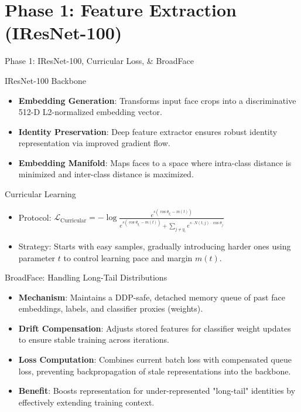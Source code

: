 \documentclass[t]{beamer}
\begin{document}
\section{Phase 1: Feature Extraction (IResNet-100)}

\begin{frame}[allowframebreaks]{Phase 1: IResNet-100, Curricular Loss, & BroadFace}
    \begin{block}{IResNet-100 Backbone}
        \begin{itemize}
            \item \textbf{Embedding Generation}: Transforms input face crops into a discriminative 512-D L2-normalized embedding vector.
            \item \textbf{Identity Preservation}: Deep feature extractor ensures robust identity representation via improved gradient flow.
            \item \textbf{Embedding Manifold}: Maps faces to a space where intra-class distance is minimized and inter-class distance is maximized.
        \end{itemize}
    \end{block}

    \begin{block}{Curricular Learning}
        \begin{itemize}
            \item Protocol: $\mathcal{L}_{\text{Curricular}} = -\log \frac{e^{s(\cos\theta_{y_i} - m(t))}}{e^{s(\cos\theta_{y_i} - m(t))} + \sum_{j \neq y_i} e^{s \cdot N(t, j) \cdot \cos\theta_j}}$
            \item Strategy: Starts with easy samples, gradually introducing harder ones using parameter $t$ to control learning pace and margin $m(t)$.
        \end{itemize}
    \end{block}
    \framebreak
    \begin{block}{BroadFace: Handling Long-Tail Distributions}
        \begin{itemize}
            \item \textbf{Mechanism}: Maintains a DDP-safe, detached memory queue of past face embeddings, labels, and classifier proxies (weights).
            \item \textbf{Drift Compensation}: Adjusts stored features for classifier weight updates to ensure stable training across iterations.
            \item \textbf{Loss Computation}: Combines current batch loss with compensated queue loss, preventing backpropagation of stale representations into the backbone.
            \item \textbf{Benefit}: Boosts representation for under-represented "long-tail" identities by effectively extending training context.
        \end{itemize}
    \end{block}
\end{frame}
\end{document}
